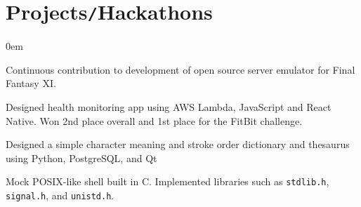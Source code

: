 \documentclass[15pt]{article}
\begin{document}
\section*{Projects\texttt{/}Hackathons}
\vspace*{-5pt}\hspace*{10pt}\begin{minipage}{0.93\textwidth}
    \begin{description}
        \itemsep0em
        \raggedright
        \item[AirSkyBoat \href{https://github.com/luke-belinc/AirSkyBoat}{\fontsize{9pt}{9pt}\faLink}] Continuous contribution to 
            development of open source server emulator for Final Fantasy XI.
        \item[DHack \href{https://github.com/kraudo/keepup}{\fontsize{9pt}{9pt}\faLink}] Designed health monitoring app using AWS 
            Lambda, JavaScript and React Native. Won 2nd place overall and 1st place for the FitBit challenge.
        \item[Chinese Character Dictionary \href{https://github.com/luke-belinc/chinese-char-dict}{\fontsize{9pt}{9pt}\faLink}] 
            Designed a simple character meaning and stroke order dictionary and thesaurus using Python, PostgreSQL, and Qt
        \item[Mock Shell \href{https://github.com/luke-belinc/c-fun}{\fontsize{9pt}{9pt}\faLink}] Mock POSIX-like shell built in C. Implemented libraries such as \texttt{stdlib.h}, \texttt{signal.h}, 
            and \texttt{unistd.h}.
    \end{description}
\end{minipage}
\end{document}
